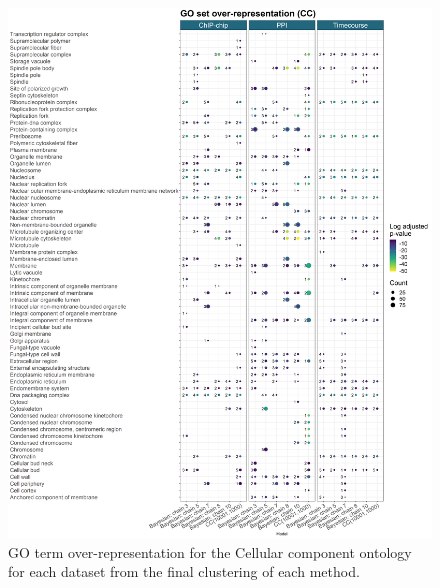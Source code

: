 \documentclass[]{article}
\begin{document}
\begin{figure}
	\centering
	\includegraphics[scale=0.365]{./Images/Yeast/goEnrichmentCompCCvertical.png}
	\caption{GO term over-representation for the Cellular component ontology for each dataset from the final clustering of each method.}
	\label{fig:yeastGOCC}
\end{figure}

\newpage

%
%
\end{document}
